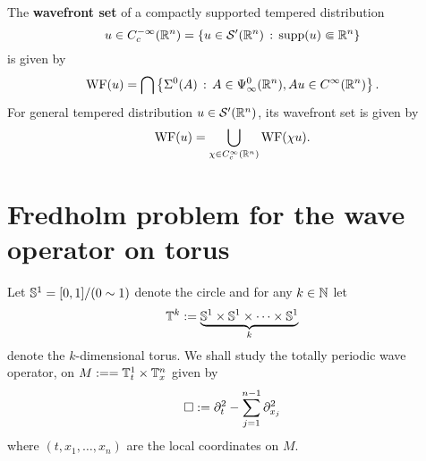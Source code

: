 \documentclass{article}
\begin{document}
\begin{fdefinition}
    The \textbf{wavefront set} of a compactly supported tempered distribution 
    \[
    u \in C^{-\infty}_c(\R^n) = \set{u \in \sch'(\R^n) \wh \supp(u) \Subset \R^n} 
    \]
    is given by 
    \begin{align*}
    \WF(u) = \bigcap \set{\Char^0(A) \wh A \in \Psi^0_\infty(\R^n), Au \in C^\infty(\R^n)}. 
    \end{align*}
    For general tempered distribution $u \in \sch'(\R^n)$, its wavefront set is given by 
    \begin{align*}
    \WF(u) = \bigcup_{\chi \in C^\infty_c(\R^n)} \WF(\chi u). 
    \end{align*}
\end{fdefinition} 



\section{Fredholm problem for the wave operator on torus} 

\begin{definition} 
    Let $\S^1 = [0,1] / (0 \sim 1)$ denote the circle and for any $k \in \N$ let
    \begin{align*}
    \T^k := \underbrace{\S^1 \times \S^1 \times \dots \times \S^1}_{k}
    \end{align*}
    denote the $k$-dimensional torus. We shall study the totally periodic wave operator, on $M :=  = \T_t^1 \times \T_x^{n}$ given by
    \begin{align}\label{eq: d'Alembertian}
    \Box := \p_t^2 - \sum_{j = 1}^{n -1} \p_{x_j}^2
    \end{align}
    where $(t, x_1, \dots, x_n)$ are the local coordinates on $M$. 
\end{definition}





\pagebreak 
\end{document}
